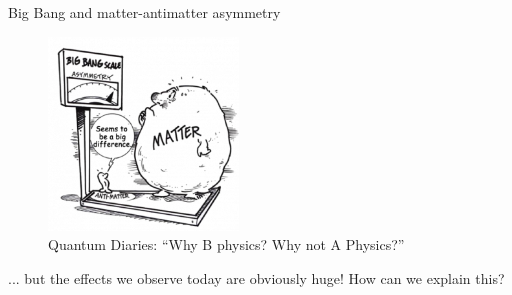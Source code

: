 \documentclass[dvipsnames]{beamer}
\begin{document}
\begin{frame}{Big Bang and matter-antimatter asymmetry}
  \begin{figure}
    \includegraphics[width=0.45\textwidth]{Plots/MatterAntimatterBigAsymmetry.png}
    \caption*{\tiny Quantum Diaries: ``Why B physics? Why not A Physics?''}
  \end{figure}
  \vspace{-0.5cm}
  \begin{center}
    \Large ... but the effects we observe today are obviously huge! How can we explain this?
  \end{center}
\end{frame}
\end{document}
